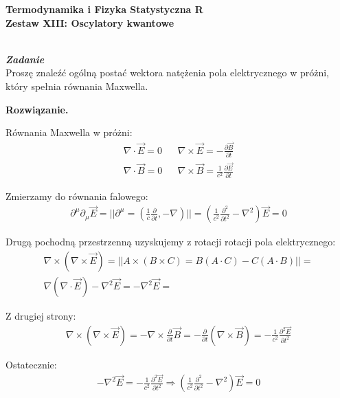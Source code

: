 \documentclass[11pt,a4paper]{article}
\newcounter{zadanie}\newcommand{\zadanie}[1][]{\addtocounter{zadanie}{1} ~\\ {\bf \emph{Zadanie \arabic{zadanie} #1 }} \\}
\newenvironment{solution}{\vspace{1cm} \par\textbf{Rozwiązanie.} \vspace{1cm}}{}
\begin{document}
   

\begin{centering}
  {\bf {\Large
  Termodynamika i Fizyka Statystyczna R \\
  Zestaw XIII: Oscylatory kwantowe
  }} \\  
\end{centering}

\vspace{1cm}

\zadanie[]

Proszę znaleźć ogólną postać wektora natężenia pola elektrycznego w próżni, 
który spełnia równania Maxwella. 

\begin{solution}

Równania Maxwella w próżni:
\begin{align*}
\nabla \cdot \vec{E} = 0 & & 
\nabla \times \vec{E} = -\frac{\partial \vec{B}}{\partial t} \\
\nabla \cdot \vec{B} = 0 & &
\nabla \times \vec{B} = \frac{1}{c^2} \frac{\partial \vec{E}}{\partial t}
\end{align*}

Zmierzamy do równania falowego:
\begin{align*}
\partial^{\mu} \partial_{\mu} \vec{E} = 
|| \partial^{\mu} = \left( \frac{1}{c} \frac{\partial}{\partial t}, -\nabla \right) || =
\left(\frac{1}{c^2} \frac{\partial^2}{\partial t^2} - \nabla^2\right) \vec{E} = 0
\end{align*}

Drugą pochodną przestrzenną uzyskujemy z rotacji rotacji pola elektrycznego:
\begin{align*}
\nabla \times (\nabla \times \vec{E}) =
|| A \times (B \times C) = B(A \cdot C) - C(A \cdot B) || = \\
\nabla (\nabla \cdot \vec{E}) - \nabla^2 \vec{E} = -\nabla^2 \vec{E} =
\end{align*}

Z drugiej strony:
\begin{align*}
\nabla \times (\nabla \times \vec{E}) =
- \nabla \times \frac{\partial}{\partial t}\vec{B} =
- \frac{\partial}{\partial t}(\nabla \times \vec{B}) =
- \frac{1}{c^2} \frac{\partial^2 \vec{E}}{\partial t^2}
\end{align*}

Ostatecznie:
\begin{align*}
- \nabla^2 \vec{E} = - \frac{1}{c^2} \frac{\partial^2 \vec{E}}{\partial t^2} \Rightarrow
\left(\frac{1}{c^2} \frac{\partial^2}{\partial t^2} - \nabla^2\right) \vec{E} = 0
\end{align*}


\end{solution}
\end{document}

